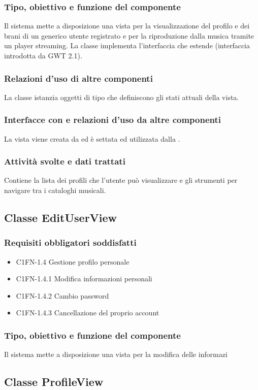 \subsubsection*{Tipo, obiettivo e funzione del componente}
Il sistema mette a disposizione una vista per la visualizzazione del profilo e
dei brani di un generico utente registrato e per la riproduzione dalla musica
tramite un player streaming. La classe  implementa
l'interfaccia  che estende  (interfaccia introdotta
da GWT 2.1).
\subsubsection*{Relazioni d'uso di altre componenti} 
La classe istanzia oggetti di tipo  che definiscono gli stati
attuali della vista.
\subsubsection*{Interfacce con e relazioni d'uso da altre componenti}
 La vista viene creata da  ed \`e settata ed utilizzata dalla
 .
 \subsubsection*{Attivit\`a svolte e dati trattati}
Contiene la lista dei profili che l'utente pu\`o visualizzare e gli strumenti
per navigare tra i cataloghi musicali.

\subsection{Classe EditUserView}
\subsubsection*{Requisiti obbligatori soddisfatti}
\begin{itemize}
	\item C1FN-1.4 Gestione profilo personale
	\item C1FN-1.4.1 Modifica informazioni personali
	\item C1FN-1.4.2 Cambio password
	\item C1FN-1.4.3 Cancellazione del proprio account
\end{itemize}
\subsubsection*{Tipo, obiettivo e funzione del componente}
Il sistema mette a disposizione una vista per la
modifica delle informazi\subsection{Classe ProfileView}
